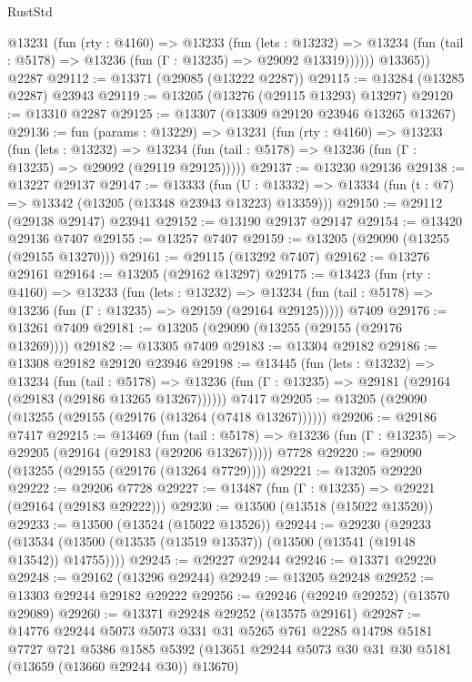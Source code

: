 \begin{lexlean}{RustStd}
\begin{coremodule}
          @13231
            (fun (rty : @4160) =>
            @13233
              (fun (lets : @13232) =>
              @13234 (fun (tail : @5178) => @13236 (fun (Γ : @13235) => @29092 @13319))))))
        @13365))
    @2287
@29112 := @13371 (@29085 (@13222 @2287))
@29115 := @13284 (@13285 @2287) @23943
@29119 := @13205 (@13276 (@29115 @13293) @13297)
@29120 := @13310 @2287
@29125 := @13307 (@13309 @29120 @23946 @13265 @13267)
@29136 := fun (params : @13229) =>
  @13231
    (fun (rty : @4160) =>
    @13233
      (fun (lets : @13232) =>
      @13234 (fun (tail : @5178) => @13236 (fun (Γ : @13235) => @29092 (@29119 @29125)))))
@29137 := @13230 @29136
@29138 := @13227 @29137
@29147 := @13333
    (fun (U : @13332) => @13334 (fun (t : @7) => @13342 (@13205 (@13348 @23943 @13223) @13359)))
@29150 := @29112 (@29138 @29147) @23941
@29152 := @13190 @29137 @29147
@29154 := @13420 @29136 @7407
@29155 := @13257 @7407
@29159 := @13205 (@29090 (@13255 (@29155 @13270)))
@29161 := @29115 (@13292 @7407)
@29162 := @13276 @29161
@29164 := @13205 (@29162 @13297)
@29175 := @13423
    (fun (rty : @4160) =>
    @13233
      (fun (lets : @13232) =>
      @13234 (fun (tail : @5178) => @13236 (fun (Γ : @13235) => @29159 (@29164 @29125)))))
    @7409
@29176 := @13261 @7409
@29181 := @13205 (@29090 (@13255 (@29155 (@29176 @13269))))
@29182 := @13305 @7409
@29183 := @13304 @29182
@29186 := @13308 @29182 @29120 @23946
@29198 := @13445
    (fun (lets : @13232) =>
    @13234
      (fun (tail : @5178) =>
      @13236 (fun (Γ : @13235) => @29181 (@29164 (@29183 (@29186 @13265 @13267))))))
    @7417
@29205 := @13205 (@29090 (@13255 (@29155 (@29176 (@13264 (@7418 @13267))))))
@29206 := @29186 @7417
@29215 := @13469
    (fun (tail : @5178) => @13236 (fun (Γ : @13235) => @29205 (@29164 (@29183 (@29206 @13267)))))
    @7728
@29220 := @29090 (@13255 (@29155 (@29176 (@13264 @7729))))
@29221 := @13205 @29220
@29222 := @29206 @7728
@29227 := @13487 (fun (Γ : @13235) => @29221 (@29164 (@29183 @29222)))
@29230 := @13500 (@13518 (@15022 @13520))
@29233 := @13500 (@13524 (@15022 @13526))
@29244 := @29230
    (@29233 (@13534 (@13500 (@13535 (@13519 @13537)) (@13500 (@13541 (@19148 @13542)) @14755))))
@29245 := @29227 @29244
@29246 := @13371 @29220
@29248 := @29162 (@13296 @29244)
@29249 := @13205 @29248
@29252 := @13303 @29244 @29182 @29222
@29256 := @29246 (@29249 @29252) (@13570 @29089)
@29260 := @13371 @29248 @29252 (@13575 @29161)
@29287 := @14776
    @29244
    @5073
    @5073
    @331
    @31
    @5265
    @761
    @2285
    @14798
    @5181
    @7727
    @721
    @5386
    @1585
    @5392
    (@13651 @29244 @5073 @30 @31 @30 @5181 (@13659 (@13660 @29244 @30)) @13670)

\end{coremodule}
\end{lexlean}

